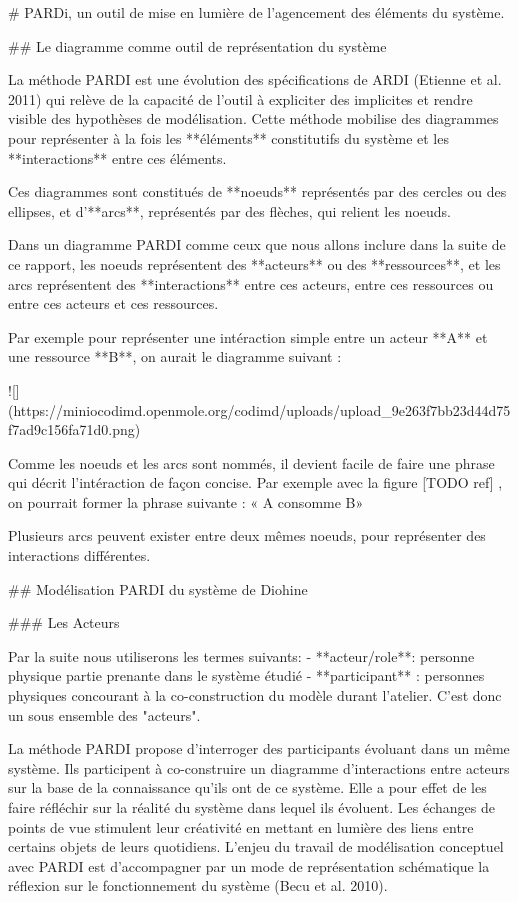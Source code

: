# PARDi, un outil de mise en lumière de l'agencement des éléments du système.

## Le diagramme  comme outil de représentation du système

La méthode PARDI est une évolution des spécifications de ARDI (Etienne et al. 2011) qui relève de la capacité de l'outil à expliciter des implicites et rendre visible des  hypothèses de modélisation. Cette méthode mobilise des diagrammes pour représenter à la fois les **éléments** constitutifs du système et les **interactions** entre ces éléments. 

Ces diagrammes sont constitués de **noeuds** représentés par des cercles ou des ellipses, et d'**arcs**, représentés par des flèches, qui relient les noeuds. 

Dans un diagramme PARDI comme ceux que nous allons inclure dans la suite de ce rapport, les noeuds représentent des **acteurs** ou des **ressources**, et les arcs représentent des **interactions** entre ces acteurs, entre ces ressources ou entre ces acteurs et ces ressources.

Par exemple pour représenter une intéraction simple entre un acteur **A** et une ressource **B**, on aurait le diagramme suivant : 


![](https://miniocodimd.openmole.org/codimd/uploads/upload_9e263f7bb23d44d75f7ad9c156fa71d0.png)


Comme les noeuds et les arcs sont nommés, il devient facile de faire une phrase qui décrit l'intéraction de façon concise. Par exemple avec la figure [TODO ref] , on pourrait former la phrase suivante : 
« A consomme B»

Plusieurs arcs peuvent exister entre deux mêmes noeuds, pour représenter des interactions différentes.


## Modélisation PARDI du système de Diohine

### Les Acteurs

Par la suite nous utiliserons les termes suivants:
- **acteur/role**: personne physique partie prenante dans le système étudié
- **participant** : personnes physiques concourant à la co-construction du modèle durant l'atelier. C'est donc un sous ensemble des "acteurs".

La méthode PARDI propose d'interroger des participants évoluant dans un même système. Ils participent à co-construire un diagramme d'interactions entre acteurs sur la base de la connaissance qu'ils ont de ce système. Elle a pour effet de les faire réfléchir sur la réalité du système dans lequel ils évoluent. Les échanges de points de vue stimulent leur créativité en mettant en lumière des liens entre certains objets de leurs quotidiens. L'enjeu du travail de modélisation conceptuel avec PARDI est d'accompagner par un mode de représentation schématique la réflexion sur le fonctionnement du système (Becu et al. 2010).

